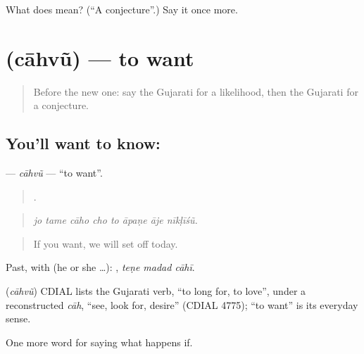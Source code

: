 \begin{tcolorbox}[breakable,colback=teal!4,colframe=teal!35!black,title={Before you move on}]
What does  mean? (\textquotedblleft{}A conjecture\textquotedblright{}.) Say it once more.
\end{tcolorbox}
\section[\texorpdfstring{\gu{ચાહવું} (cāhvũ)}{ચાહવું (cāhvũ)}]{ (cāhvũ) — to want}

\label{lesson:GU-C366-cahvu}



\begin{quote}
Before the new one: say the Gujarati for a likelihood, then the Gujarati for a conjecture.
\end{quote}

\subsection*{You'll want to know: }
\textbf{} — \emph{cāhvũ} — \textquotedblleft{}to want\textquotedblright{}.

\begin{quote}
       .
\end{quote}

\begin{quote}
\emph{jo tame cāho cho to āpaṇe āje nīkḷīśũ.}
\end{quote}

\begin{quote}
If you want, we will set off today.
\end{quote}

Past, with  (he or she …):   , \emph{teṇe madad cāhī}.

\begin{cousinweb}
\textbf{} (\emph{cāhvũ}) CDIAL lists the Gujarati verb, \textquotedblleft{}to long for, to love\textquotedblright{}, under a reconstructed \emph{cāh}, \textquotedblleft{}see, look for, desire\textquotedblright{} (CDIAL 4775); \textquotedblleft{}to want\textquotedblright{} is its everyday sense.
\end{cousinweb}

\begin{grammarlens}[title={What you've built}]
One more word for saying what happens if.
\end{grammarlens}

